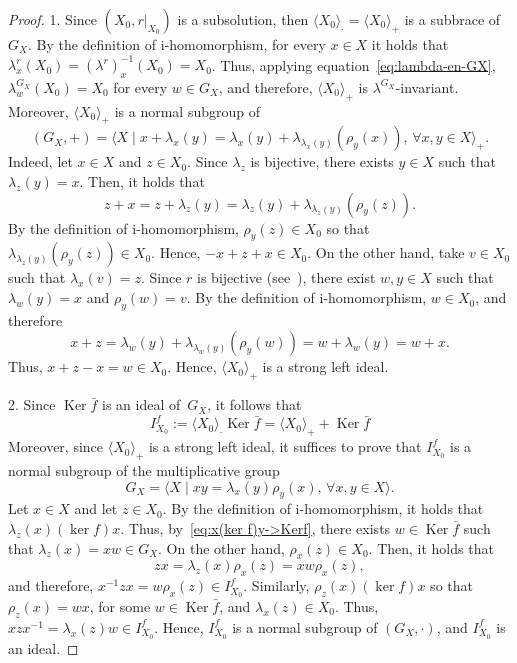 \documentclass[12pt, a4paper, english]{article}
\theoremstyle{definition}
\theoremstyle{remark}
\DeclareMathOperator{\Ker}{Ker}
\newcommand{\bigcdot}{\boldsymbol{\cdot}}
\begin{document}
\begin{proof}
1. Since $(X_0, \left. r\right|_{X_0})$ is a subsolution, then $\langle X_0\rangle_{\bigcdot} = \langle X_0 \rangle_+$ is a subbrace of $G_X$. By the definition of i-homomorphism, for every $x\in X$ it holds that $\lambda^r_x(X_0) = (\lambda^r)_x^{-1}(X_0) = X_0$. Thus, applying equation~\eqref{eq:lambda-en-GX}, $\lambda^{G_X}_w(X_0) = X_0$ for every $w \in G_X$, and therefore, $\langle X_0\rangle_+$ is $\lambda^{G_X}$-invariant. Moreover, $\langle X_0 \rangle_+$ is a normal subgroup of 
\[ (G_X,+) = \langle X \mid x + \lambda_x(y) = \lambda_x(y) + \lambda_{\lambda_x(y)}(\rho_y(x)),\, \forall x,y\in X \rangle_+.\]
Indeed, let $x \in X$ and $z\in X_0$. Since $\lambda_z$ is bijective, there exists $y\in X$ such that $\lambda_z(y) = x$. Then, it holds that
\[ z + x = z + \lambda_z(y) = \lambda_z(y) + \lambda_{\lambda_z(y)}(\rho_y(z)).\]
By the definition of i-homomorphism, $\rho_y(z)\in X_0$ so that $\lambda_{\lambda_z(y)}(\rho_y(z))\in X_0$. Hence, $-x + z + x \in X_0$. On the other hand, take $v \in X_0$ such that $\lambda_x(v) = z$. Since $r$ is bijective (see~\cite[Corollary 3.4]{JedlickaPilitowska26}), there exist $w, y \in X$  such that $\lambda_w(y) = x$ and $\rho_y(w) = v$. By the definition of i-homomorphism, $w \in X_0$, and therefore
\[ x + z = \lambda_w(y) + \lambda_{\lambda_w(y)}(\rho_y(w)) = w + \lambda_w(y) = w + x.\]
Thus, $x + z - x = w \in X_0$. Hence, $\langle X_0\rangle_+$ is a strong left ideal.


2. Since $\Ker \bar{f}$ is an ideal of~$G_X$, it follows that
\[ I^f_{X_0}:= \langle X_0\rangle_{\bigcdot}\Ker \bar{f} = \langle X_0\rangle_+ + \Ker \bar{f}\]
Moreover, since $\langle X_0\rangle_+$ is a strong left ideal, it suffices to prove that $I^f_{X_0}$ is a normal subgroup of the multiplicative group 
\[ G_X = \langle X \mid xy = \lambda_x(y)\rho_y(x), \, \forall x, y\in X \rangle.\]
Let $x \in X$ and let $z \in X_0$. By the definition of i-homomorphism, it holds that $\lambda_z(x) (\ker f) x$. Thus, by~\eqref{eq:x(ker f)y->Kerf}, there exists $w \in \Ker \bar{f}$ such that $\lambda_z(x) = xw \in G_X$. On the other hand, $\rho_x(z) \in X_0$. Then, it holds that 
\[ zx = \lambda_z(x)\rho_x(z) = xw\rho_x(z),\]
and therefore, $x^{-1}zx = w \rho_x(z) \in I^{f}_{X_0}$. Similarly, $\rho_z(x) (\ker f) x$ so that $\rho_z(x) = wx$, for some $w \in \Ker\bar{f}$, and $\lambda_x(z) \in X_0$. Thus, 
$xzx^{-1} = \lambda_x(z)w \in I^f_{X_0}$. Hence, $I^f_{X_0}$ is a normal subgroup of $(G_X,\cdot)$, and $I^f_{X_0}$ is an ideal.


\end{proof}
\end{document}

